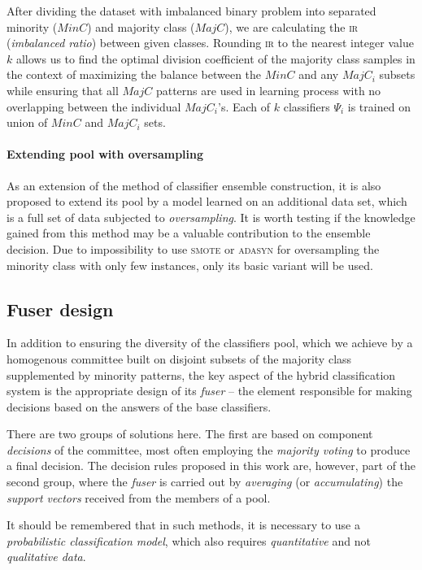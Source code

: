 \documentclass[pmlr]{jmlr}
\begin{document}
After dividing the dataset with imbalanced binary problem into separated minority ($MinC$) and majority class ($MajC$), we are calculating the \textsc{ir} (\emph{imbalanced ratio}) between given classes. Rounding \textsc{ir} to the nearest integer value $k$ allows us to find the optimal division coefficient of the majority class samples in the context of maximizing the balance between the $MinC$ and any $MajC_i$ subsets while ensuring that all $MajC$ patterns are used in learning process with no overlapping between the individual $MajC_i$'s. Each of $k$ classifiers $\Psi_i$ is trained on union of $MinC$ and $MajC_i$ sets.

\paragraph{Extending pool with oversampling} As an extension of the method of classifier ensemble construction, it is also proposed to extend its pool by a model learned on an additional data set, which is a full set of data subjected to \emph{oversampling}. It is worth testing if the knowledge gained from this method may be a valuable contribution to the ensemble decision. Due to impossibility to use \textsc{smote} or \textsc{adasyn} for oversampling the minority class with only few instances, only its basic variant will be used. 

\subsection{Fuser design}

In addition to ensuring the diversity of the classifiers pool, which we achieve by a homogenous committee built on disjoint subsets of the majority class supplemented by minority patterns, the key aspect of the hybrid classification system is the appropriate design of its \emph{fuser} -- the element responsible for making decisions based on the answers of the base classifiers.

There are two groups of solutions here. The first are based on component \emph{decisions} of the committee, most often employing the \emph{majority voting} to produce a final decision. The decision rules proposed in this work are, however, part of the second group, where the \emph{fuser} is carried out by \emph{averaging} (or \emph{accumulating}) the \emph{support vectors} received from the members of a pool.

\begin{note}
It should be remembered that in such methods, it is necessary to use a \emph{probabilistic classification model}, which also requires \emph{quantitative} and not \emph{qualitative data}.
\end{note}
\end{document}
